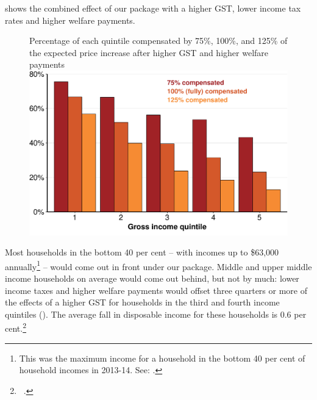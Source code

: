  shows the combined effect of our package with a higher GST, lower income tax rates and higher welfare payments.

\begin{figure}
%
{Percentage of each quintile compensated by 75\%, 100\%, and 125\% of the expected price increase after higher GST and higher welfare payments}
\includegraphics[width=\columnwidth]{atlas/figure/GST-Figure-9-1.pdf}

\end{figure}

Most households in the bottom 40 per cent – with incomes up to \$63,000 annually\footnote{This was the maximum income for a household in the bottom 40 per cent of household incomes in 2013-14. See: \textcite{ABS2015HouseholdIncomeWealth1314}.}  – would come out in front under our package. Middle and upper middle income households on average would come out behind, but not by much: lower income taxes and higher welfare payments would offset three quarters or more of the effects of a higher GST for households in the third and fourth income quintiles (). The average fall in disposable income for these households is 0.6 per cent.\footnote{\gao\ \textcite{ABS2013-HES-2011-12-CURF}.}  

